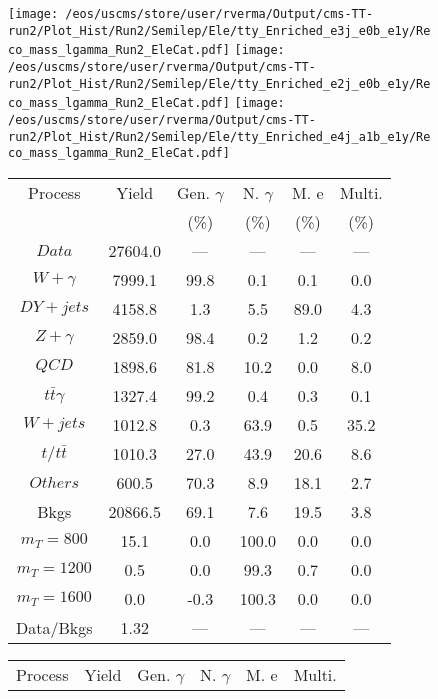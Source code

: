 \begin{figure}
\centering
\texttt{[image: /eos/uscms/store/user/rverma/Output/cms-TT-run2/Plot\_Hist/Run2/Semilep/Ele/tty\_Enriched\_e3j\_e0b\_e1y/Reco\_mass\_lgamma\_Run2\_EleCat.pdf]}
\texttt{[image: /eos/uscms/store/user/rverma/Output/cms-TT-run2/Plot\_Hist/Run2/Semilep/Ele/tty\_Enriched\_e2j\_e0b\_e1y/Reco\_mass\_lgamma\_Run2\_EleCat.pdf]}
\texttt{[image: /eos/uscms/store/user/rverma/Output/cms-TT-run2/Plot\_Hist/Run2/Semilep/Ele/tty\_Enriched\_e4j\_a1b\_e1y/Reco\_mass\_lgamma\_Run2\_EleCat.pdf]}
\begin{minipage}[c]{0.32\textwidth}
\centering
\tiny{
\begin{tabular}{cccccc}
\hline
Process & Yield & Gen. $\gamma$ & N. $\gamma$ & M. e & Multi. \\
 &  & (\%) & (\%) & (\%) & (\%)  \\
\hline
                                                                      $ Data $ &  27604.0 &  --- &  --- &  --- &  ---\\
$ W+\gamma $ &  7999.1 &  99.8 &  0.1 &  0.1 &  0.0\\
$ DY+jets $ &  4158.8 &  1.3 &  5.5 &  89.0 &  4.3\\
$ Z+\gamma $ &  2859.0 &  98.4 &  0.2 &  1.2 &  0.2\\
$ QCD $ &  1898.6 &  81.8 &  10.2 &  0.0 &  8.0\\
$ t\bar{t}\gamma $ &  1327.4 &  99.2 &  0.4 &  0.3 &  0.1\\
$ W+jets $ &  1012.8 &  0.3 &  63.9 &  0.5 &  35.2\\
$ t/t\bar{t} $ &  1010.3 &  27.0 &  43.9 &  20.6 &  8.6\\
$ Others $ &  600.5 &  70.3 &  8.9 &  18.1 &  2.7\\
Bkgs &  20866.5 &  69.1 &  7.6 &  19.5 &  3.8\\
$ m_{T} = 800 $ &  15.1 &  0.0 &  100.0 &  0.0 &  0.0\\
$ m_{T} = 1200 $ &  0.5 &  0.0 &  99.3 &  0.7 &  0.0\\
$ m_{T} = 1600 $ &  0.0 &  -0.3 &  100.3 &  0.0 &  0.0\\
Data/Bkgs &  1.32 &  --- &  --- &  --- &  ---\\
\hline
\end{tabular}
}
\end{minipage}
\begin{minipage}[c]{0.32\textwidth}
\centering
\tiny{
\begin{tabular}{cccccc}
\hline
Process & Yield & Gen. $\gamma$ & N. $\gamma$ & M. e & Multi. \\

\end{tabular}}
\end{minipage}
\end{figure}
